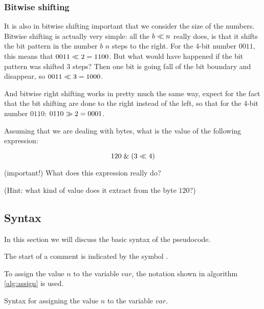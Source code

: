 \subsubsection{Bitwise shifting}

It is also in bitwise shifting important that we consider the size of
the numbers. Bitwise shifting is actually very simple: all the $b
\ll n$ really does, is that it shifts the bit pattern in the
number $b$ $n$ steps to the right. For the 4-bit number $0011$, this
means that $0011 \ll 2 = 1100$. But what would have happened if
the bit pattern was shifted 3 steps? Then one bit is going fall of the
bit boundary and disappear, so $0011 \ll 3 = 1000$.

And bitwise right shifting works in pretty much the same way, expect
for the fact that the bit shifting are done to the right instead of
the left, so that for the 4-bit number $0110$: $0110 \gg 2 =
0001$.

\begin{Exercise}[label={bit-shiting}]
  Assuming that we are dealing with bytes, what is the value of the
  following expression:

  \begin{equation*}
    120 \mathrel{\&} (3 \ll 4)
  \end{equation*}

  (important!) What does this expression really do?

  (Hint: what kind of value does it extract from the byte $120$?)

\end{Exercise}


\subsection{Syntax}

In this section we will discuss the basic syntax of the pseudocode.

The start of a comment is indicated by the symbol \commentsymbol.

To assign the value $n$ to the variable $var$, the notation shown in
algorithm \ref{alg:assign} is used.



\begin{algorithm}[H]
  \caption{Syntax for assigning the value $n$ to the variable $var$.}
  \label{alg:assign}
  \begin{algorithmic}[1]
  \end{algorithmic}
\end{algorithm}


